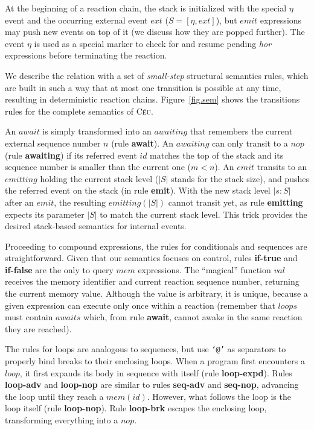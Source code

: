 \documentclass{acm_proc_article-sp}
\newcommand{\CEU}{\textsc{C\'{e}u}\xspace}
\newcommand{\code}[1] {{\small{\texttt{#1}}}}
\newcommand{\rr}[1] {{\textbf{\scriptsize{#1}}}}
\newcommand{\1}{\;}
\newcommand{\2}{\;\;}
\newcommand{\3}{\;\;\;}
\newcommand{\5}{\;\;\;\;\;}
\begin{document}
At the beginning of a reaction chain, the stack is initialized with the special 
$\eta$ event and the occurring external event $ext$ ($S=[\eta,ext]$), but 
$emit$ expressions may push new events on top of it (we discuss how they are 
popped further).
%
The event $\eta$ is used as a special marker to check for and resume pending 
\emph{hor} expressions before terminating the reaction.

We describe the relation with a set of \emph{small-step} structural semantics 
rules, which are built in such a way that at most one transition is possible at 
any time, resulting in deterministic reaction chains.
%
Figure~\ref{fig.sem} shows the transitions rules for the complete semantics of 
\CEU.

An $await$ is simply transformed into an $awaiting$ that remembers the current 
external sequence number $n$ (rule \rr{await}).
An $awaiting$ can only transit to a $nop$ (rule \rr{awaiting}) if its referred 
event $id$ matches the top of the stack and its sequence number is smaller than 
the current one ($m<n$).
%
%
An $emit$ transits to an $emitting$ holding the current stack level ($|S|$ 
stands for the stack size), and pushes the referred event on the stack (in rule 
\rr{emit}).
With the new stack level $|s:S|$ after an $emit$, the resulting $emitting(|S|)$ 
cannot transit yet, as rule \rr{emitting} expects its parameter $|S|$ to match 
the current stack level.
This trick provides the desired stack-based semantics for internal events.

Proceeding to compound expressions, the rules for conditionals and sequences 
are straightforward.
%
Given that our semantics focuses on control, rules \rr{if-true} and 
\rr{if-false} are the only to query $mem$ expressions.
%
The ``magical'' function $val$ receives the memory identifier and current 
reaction sequence number, returning the current memory value.
%
Although the value is arbitrary, it is unique, because a given expression can 
execute only once within a reaction (remember that $loops$ must contain 
$awaits$ which, from rule \rr{await}, cannot awake in the same reaction they 
are reached).

The rules for loops are analogous to sequences, but use \code{`@'} as 
separators to properly bind breaks to their enclosing loops.
%
When a program first encounters a $loop$, it first expands its body in sequence 
with itself (rule \rr{loop-expd}).
Rules \rr{loop-adv} and \rr{loop-nop} are similar to rules \rr{seq-adv} and 
\rr{seq-nop}, advancing the loop until they reach a $mem(id)$.
However, what follows the loop is the loop itself (rule \rr{loop-nop}).
%
Rule \rr{loop-brk} escapes the enclosing loop, transforming everything into a 
$nop$.
\end{document}
